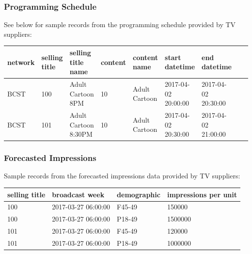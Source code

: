 \documentclass{beamer}
\begin{document}
\begin{frame}
\frametitle{Programming Schedule}
See below for sample records from the programming schedule provided by TV suppliers:
    \begin{table}[h!]
      \centering
      \begin{adjustbox}{width=1\textwidth,center=\textwidth}
        \large
        \begin{tabular}{lllllllll}
          network & selling title & selling title name & content & content name & start datetime & end datetime \\
          \hline
          BCST & 100 & Adult Cartoon 8PM & 10 & Adult Cartoon & 2017-04-02 20:00:00 & 2017-04-02 20:30:00 \\
          BCST & 101 & Adult Cartoon 8:30PM & 10 & Adult Cartoon & 2017-04-02 20:30:00 & 2017-04-02 21:00:00 \\
        \end{tabular}
      \end{adjustbox}
    \end{table}
\end{frame}

\begin{frame}
\frametitle{Forecasted Impressions}
Sample records from the forecasted impressions data provided by TV suppliers:
    \begin{table}[h!]
      \centering
        \begin{tabular}{llll}
          selling title & broadcast week & demographic & impressions per unit \\
          \hline
          100 & 2017-03-27 06:00:00 & F45-49 & 150000 \\
          100 & 2017-03-27 06:00:00 & P18-49 & 1500000 \\
          101 & 2017-03-27 06:00:00 & F45-49 & 120000 \\
          101 & 2017-03-27 06:00:00 & P18-49 & 1000000 \\
        \end{tabular}
    \end{table}

\end{frame}
\end{document}

